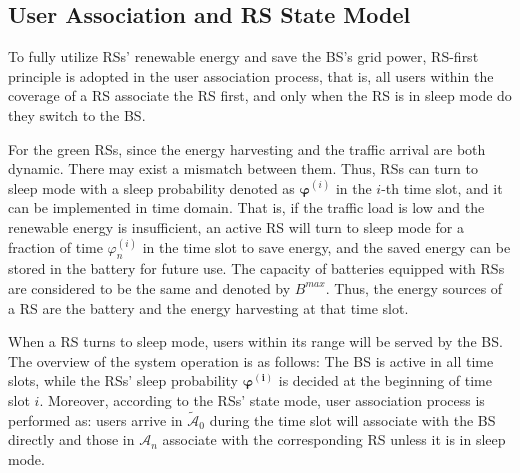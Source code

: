 \documentclass[conference]{IEEEtran}
\begin{document}
 \subsection{User Association and RS State Model}
 To fully utilize RSs' renewable energy and save the BS's grid power, RS-first principle is adopted in the user association process, that is, all users within the coverage of a RS associate the RS first, and only when the RS is in sleep mode do they switch to the BS.

 For the green RSs, since the energy harvesting and the traffic arrival are both dynamic. There may exist a mismatch between them. Thus, RSs can turn to sleep mode with a sleep probability denoted as $\boldsymbol{\varphi}^{(i)}$ in the $i$-th time slot, and it can be implemented in time domain. That is, if the traffic load is low and the renewable energy is insufficient, an active RS will turn to sleep mode for a fraction of time $\varphi^{(i)}_n$ in the time slot to save energy, and the saved energy can be stored in the battery for future use. The capacity of batteries equipped with RSs are considered to be the same and denoted by $B^{max}$. Thus, the energy sources of a RS are the battery and the energy harvesting at that time slot.

 When a RS turns to sleep mode, users within its range will be served by the BS. The overview of the system operation is as follows: The BS is active in all time slots, while the RSs' sleep probability $\boldsymbol{\varphi^{(i)}}$ is decided at the beginning of time slot $i$. Moreover, according to the RSs' state mode, user association process is performed as: users arrive in $\widetilde{\mathcal{A}}_0$ during the time slot will associate with the BS directly and those in $\mathcal{A}_n$ associate with the corresponding RS unless it is in sleep mode.
\end{document}
